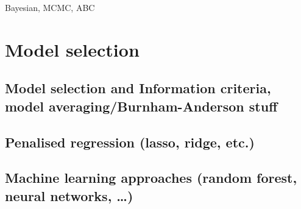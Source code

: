 \documentclass[
]{book}
\theoremstyle{definition}
\theoremstyle{definition}
\theoremstyle{definition}
\theoremstyle{definition}
\theoremstyle{remark}
\begin{document}
Bayesian,
MCMC,
ABC

\section{Model selection}\label{model-selection}

\subsection{Model selection and Information criteria, model averaging/Burnham-Anderson stuff}\label{model-selection-and-information-criteria-model-averagingburnham-anderson-stuff}

\subsection{Penalised regression (lasso, ridge, etc.)}\label{penalised-regression-lasso-ridge-etc.}

\subsection{Machine learning approaches (random forest, neural networks, \ldots)}\label{machine-learning-approaches-random-forest-neural-networks}

  
\end{document}
